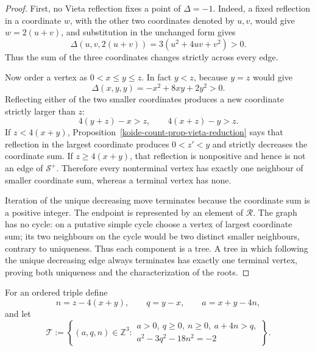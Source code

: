 \begin{proof}
First, no Vieta reflection fixes a point of $\Delta=-1$.  Indeed, a fixed
reflection in a coordinate $w$, with the other two coordinates denoted by
$u,v$, would give $w=2(u+v)$, and substitution in the unchanged form gives
\[
 \Delta(u,v,2(u+v))=3(u^2+4uv+v^2)>0.
\]
Thus the sum of the three coordinates changes strictly across every edge.

Now order a vertex as $0<x\leq y\leq z$.  In fact $y<z$, because $y=z$
would give
\[
 \Delta(x,y,y)=-x^2+8xy+2y^2>0.
\]
Reflecting either of the two smaller coordinates produces a new coordinate
strictly larger than $z$:
\[
 4(y+z)-x>z,\qquad 4(x+z)-y>z.
\]
If $z<4(x+y)$, Proposition~\ref{koide-count-prop-vieta-reduction} says
that reflection in the largest coordinate produces $0<z'<y$ and strictly
decreases the coordinate sum.  If $z\geq4(x+y)$, that reflection is
nonpositive and hence is not an edge of $\mathcal S^+$.  Therefore every
nonterminal vertex has exactly one neighbour of smaller coordinate sum,
whereas a terminal vertex has none.

Iteration of the unique decreasing move terminates because the coordinate
sum is a positive integer.  The endpoint is represented by an element of
$\mathcal R$.  The graph has no cycle: on a putative simple cycle choose a
vertex of largest coordinate sum; its two neighbours on the cycle would be
two distinct smaller neighbours, contrary to uniqueness.  Thus each
component is a tree.  A tree in which following the unique decreasing edge
always terminates has exactly one terminal vertex, proving both uniqueness
and the characterization of the roots.
\end{proof}

For an ordered triple define
\begin{equation}
 n=z-4(x+y),\qquad q=y-x,\qquad a=x+y-4n,
 \label{koide-count-eq-forward-coordinates}
\end{equation}
and let
\begin{equation}
 \mathcal T:=
 \left\{(a,q,n)\in\mathbb Z^3:
 \begin{array}{c}
 a>0,\ q\geq0,\ n\geq0,\ a+4n>q,\\
 a^2-3q^2-18n^2=-2
 \end{array}
 \right\}.
 \label{koide-count-eq-ternary-chamber}
\end{equation}

